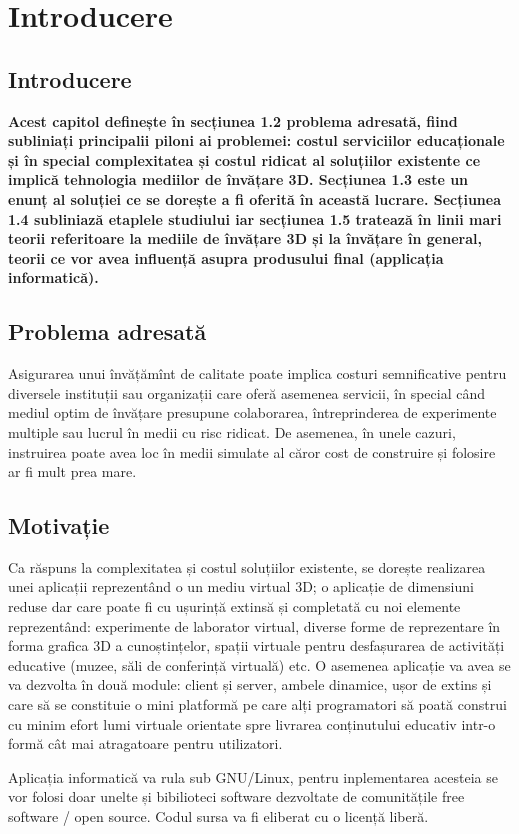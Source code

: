 
\chapter{Introducere}
\label{cap:Introducere}
\pagestyle{headings}
\section{Introducere}
\par \textbf{Acest capitol definește în secțiunea 1.2 problema adresată, fiind subliniați principalii piloni ai problemei: costul serviciilor educaționale și în special complexitatea și costul ridicat al soluțiilor existente ce implică tehnologia mediilor de învățare 3D. Secțiunea 1.3 este un enunț al soluției ce se dorește a fi oferită în această lucrare. Secțiunea 1.4 subliniază etaplele studiului iar secțiunea 1.5 tratează în linii mari teorii referitoare la mediile de învățare 3D și la învățare în general, teorii ce vor avea influență asupra produsului final (applicația informatică).}
\section{Problema adresată}
\par Asigurarea unui învățămînt de calitate poate implica costuri semnificative pentru diversele instituții sau organizații care oferă asemenea servicii, în special când mediul optim de învățare presupune colaborarea, întreprinderea de experimente multiple sau lucrul în medii cu risc ridicat. De asemenea, în unele cazuri, instruirea poate avea loc în medii simulate al căror cost de construire și folosire ar fi mult prea mare.
\section{Motivație}
\par Ca răspuns la complexitatea și costul soluțiilor existente, se dorește realizarea unei aplicații reprezentând o un mediu virtual 3D; o aplicație de dimensiuni reduse dar care poate fi cu ușurință extinsă și completată cu noi elemente reprezentând: experimente de laborator virtual, diverse forme de reprezentare în forma grafica 3D a cunoștințelor, spații virtuale pentru desfașurarea de activități educative (muzee, săli de conferință virtuală) etc. 
O asemenea aplicație va avea se va dezvolta în două module: client și server, ambele dinamice, ușor de extins și care să se constituie o mini platformă pe care alți programatori să poată construi cu minim efort lumi virtuale orientate spre livrarea conținutului educativ intr-o formă cât mai atragatoare pentru utilizatori.
\par Aplicația informatică va rula sub GNU/Linux, pentru inplementarea acesteia se vor folosi doar unelte și bibilioteci software dezvoltate de comunitățile free software / open source. Codul sursa va fi eliberat cu o licență liberă.
